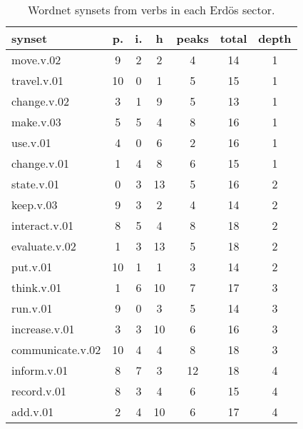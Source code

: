 \begin{table}[h!]
\begin{center}
\begin{tabular}{| l || c | c | c || c | c | c |}\hline
{\bf synset} & {\bf p.} & {\bf i.} & {\bf h} & {\bf peaks} & {\bf total} & {\bf depth} \\\hline\hline
move.v.02 & 9  & 2  & 2  & 4  & 14  & 1 \\
travel.v.01 & 10  & 0  & 1  & 5  & 15  & 1 \\
change.v.02 & 3  & 1  & 9  & 5  & 13  & 1 \\
make.v.03 & 5  & 5  & 4  & 8  & 16  & 1 \\
use.v.01 & 4  & 0  & 6  & 2  & 16  & 1 \\
change.v.01 & 1  & 4  & 8  & 6  & 15  & 1 \\\hline
state.v.01 & 0  & 3  & 13  & 5  & 16  & 2 \\
keep.v.03 & 9  & 3  & 2  & 4  & 14  & 2 \\
interact.v.01 & 8  & 5  & 4  & 8  & 18  & 2 \\
evaluate.v.02 & 1  & 3  & 13  & 5  & 18  & 2 \\
put.v.01 & 10  & 1  & 1  & 3  & 14  & 2 \\\hline
think.v.01 & 1  & 6  & 10  & 7  & 17  & 3 \\
run.v.01 & 9  & 0  & 3  & 5  & 14  & 3 \\
increase.v.01 & 3  & 3  & 10  & 6  & 16  & 3 \\
communicate.v.02 & 10  & 4  & 4  & 8  & 18  & 3 \\\hline
inform.v.01 & 8  & 7  & 3  & 12  & 18  & 4 \\
record.v.01 & 8  & 3  & 4  & 6  & 15  & 4 \\
add.v.01 & 2  & 4  & 10  & 6  & 17  & 4 \\\hline
\end{tabular}
\caption{Wordnet synsets from verbs in each Erd\"os sector.}
\end{center}
\end{table}